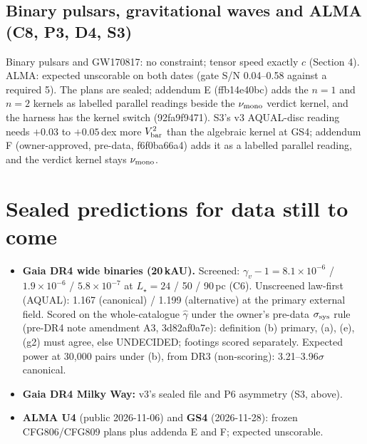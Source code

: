 \documentclass[10pt]{article}
\begin{document}
\subsection{Binary pulsars, gravitational waves and ALMA (C8, P3, D4, S3)}
Binary pulsars and GW170817: no constraint; tensor speed exactly $c$ (Section 4). ALMA: expected unscorable on both dates (gate S/N 0.04--0.58 against a required 5). The plans are sealed; addendum E (ffb14e40bc) adds the $n=1$ and $n=2$ kernels as labelled parallel readings beside the $\nu_{\rm mono}$ verdict kernel, and the harness has the kernel switch (92fa9f9471). S3's v3 AQUAL-disc reading needs $+0.03$ to $+0.05$\,dex more $V^2_{\rm bar}$ than the algebraic kernel at GS4; addendum F (owner-approved, pre-data, f6f0ba66a4) adds it as a labelled parallel reading, and the verdict kernel stays $\nu_{\rm mono}$.

\section{Sealed predictions for data still to come}
\begin{itemize}
\item \textbf{Gaia DR4 wide binaries (20\,kAU).} Screened: $\gamma_v-1=8.1\times10^{-6}$ / $1.9\times10^{-6}$ / $5.8\times10^{-7}$ at $L_\star=24$ / 50 / 90\,pc (C6). Unscreened law-first (AQUAL): 1.167 (canonical) / 1.199 (alternative) at the primary external field. Scored on the whole-catalogue $\hat\gamma$ under the owner's pre-data $\sigma_{\rm sys}$ rule (pre-DR4 note amendment A3, 3d82af0a7e): definition (b) primary, (a), (e), (g2) must agree, else UNDECIDED; footings scored separately. Expected power at 30,000 pairs under (b), from DR3 (non-scoring): 3.21--3.96$\sigma$ canonical.
\item \textbf{Gaia DR4 Milky Way:} v3's sealed file and P6 asymmetry (S3, above).
\item \textbf{ALMA U4} (public 2026-11-06) and \textbf{GS4} (2026-11-28): frozen CFG806/CFG809 plans plus addenda E and F; expected unscorable.
\end{itemize}
\end{document}
